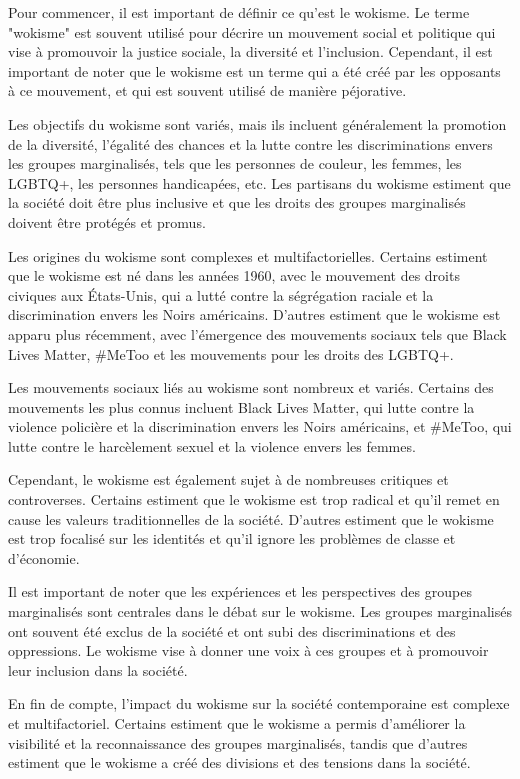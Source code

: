 Pour commencer, il est important de définir ce qu'est le wokisme. Le terme "wokisme" est souvent utilisé pour décrire un mouvement social et politique qui vise à promouvoir la justice sociale, la diversité et l'inclusion. Cependant, il est important de noter que le wokisme est un terme qui a été créé par les opposants à ce mouvement, et qui est souvent utilisé de manière péjorative.

Les objectifs du wokisme sont variés, mais ils incluent généralement la promotion de la diversité, l'égalité des chances et la lutte contre les discriminations envers les groupes marginalisés, tels que les personnes de couleur, les femmes, les LGBTQ+, les personnes handicapées, etc. Les partisans du wokisme estiment que la société doit être plus inclusive et que les droits des groupes marginalisés doivent être protégés et promus.

Les origines du wokisme sont complexes et multifactorielles. Certains estiment que le wokisme est né dans les années 1960, avec le mouvement des droits civiques aux États-Unis, qui a lutté contre la ségrégation raciale et la discrimination envers les Noirs américains. D'autres estiment que le wokisme est apparu plus récemment, avec l'émergence des mouvements sociaux tels que Black Lives Matter, #MeToo et les mouvements pour les droits des LGBTQ+.

Les mouvements sociaux liés au wokisme sont nombreux et variés. Certains des mouvements les plus connus incluent Black Lives Matter, qui lutte contre la violence policière et la discrimination envers les Noirs américains, et #MeToo, qui lutte contre le harcèlement sexuel et la violence envers les femmes.

Cependant, le wokisme est également sujet à de nombreuses critiques et controverses. Certains estiment que le wokisme est trop radical et qu'il remet en cause les valeurs traditionnelles de la société. D'autres estiment que le wokisme est trop focalisé sur les identités et qu'il ignore les problèmes de classe et d'économie.

Il est important de noter que les expériences et les perspectives des groupes marginalisés sont centrales dans le débat sur le wokisme. Les groupes marginalisés ont souvent été exclus de la société et ont subi des discriminations et des oppressions. Le wokisme vise à donner une voix à ces groupes et à promouvoir leur inclusion dans la société.

En fin de compte, l'impact du wokisme sur la société contemporaine est complexe et multifactoriel. Certains estiment que le wokisme a permis d'améliorer la visibilité et la reconnaissance des groupes marginalisés, tandis que d'autres estiment que le wokisme a créé des divisions et des tensions dans la société.

